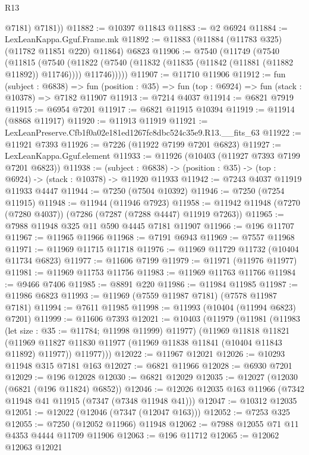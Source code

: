 \begin{lexlean}{R13}
\begin{coremodule}
          @7181)
        @7181))
@11882 := @10397 @11843
@11883 := @2 @6924
@11884 := LexLeanKappa.Gguf.Frame.mk
@11892 := @11883 (@11884 (@11783 @325) (@11782 @11851 @220) @11864) @6823
@11906 := @7540
    (@11749
      (@7540
        (@11815
          (@7540
            (@11822 (@7540 (@11832 (@11835 (@11842 (@11881 (@11882 @11892)) @11746)))) @11746)))))
@11907 := @11710 @11906
@11912 := fun (subject : @6838) =>
  fun (position : @35) => fun (top : @6924) => fun (stack : @10378) => @7182 @11907
@11913 := @7214 @4037
@11914 := @6821 @7919
@11915 := @6954 @7201
@11917 := @6821 @11915 @10394
@11919 := @11914 (@8868 @11917)
@11920 := @11913 @11919
@11921 := LexLeanPreserve.Cfb1f0a02e181ed1267fc8dbc524c35e9.R13.__fits_63
@11922 := @11921 @7393
@11926 := @7226 (@11922 @7199 @7201 @6823)
@11927 := LexLeanKappa.Gguf.element
@11933 := @11926 (@10403 (@11927 @7393 @7199 @7201 @6823))
@11938 := (subject : @6838) ->
  (position : @35) -> (top : @6924) -> (stack : @10378) -> @11920 @11933
@11942 := @7243 @4037 @11919 @11933 @4447
@11944 := @7250 (@7504 @10392)
@11946 := @7250 (@7254 @11915)
@11948 := @11944 (@11946 @7923)
@11958 := @11942 @11948 (@7270 (@7280 @4037)) (@7286 (@7287 (@7288 @4447) @11919 @7263))
@11965 := @7988 @11948 @325 @11 @590 @4445 @7181 @11907
@11966 := @196 @11707
@11967 := @11965 @11966
@11968 := @7191 @6943
@11969 := @7557 @11968
@11971 := @11969 @11715 @11718
@11976 := @11969 @11729 @11732 (@10404 @11734 @6823)
@11977 := @11606 @7199
@11979 := @11971 (@11976 @11977)
@11981 := @11969 @11753 @11756
@11983 := @11969 @11763 @11766
@11984 := @9466 @7406
@11985 := @8891 @220
@11986 := @11984 @11985
@11987 := @11986 @6823
@11993 := @11969 (@7559 @11987 @7181) (@7578 @11987 @7181)
@11994 := @7611 @11985
@11998 := @11993 (@10404 (@11994 @6823) @7201)
@11999 := @11606 @7393
@12021 := @10403
    (@11979
      (@11981
        (@11983 (let size : @35 := @11784; @11998 @11999) @11977)
        (@11969
          @11818
          @11821
          (@11969 @11827 @11830 @11977 (@11969 @11838 @11841 (@10404 @11843 @11892) @11977))
          @11977)))
@12022 := @11967 @12021
@12026 := @10293 @11948 @315 @7181 @163
@12027 := @6821 @11966
@12028 := @6930 @7201
@12029 := @196 @12028
@12030 := @6821 @12029
@12035 := @12027 (@12030 (@6821 (@196 @11824) @6852))
@12046 := @12026 @12035 @163 @11966 (@7342 @11948 @41 @11915 (@7347 (@7348 @11948 @41)))
@12047 := @10312 @12035
@12051 := @12022 (@12046 (@7347 (@12047 @163)))
@12052 := @7253 @325
@12055 := @7250 (@12052 @11966) @11948
@12062 := @7988 @12055 @71 @11 @4353 @4444 @11709 @11906
@12063 := @196 @11712
@12065 := @12062 @12063 @12021

\end{coremodule}
\end{lexlean}
